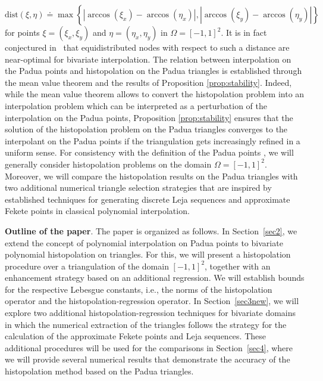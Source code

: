 \documentclass{svjour3}
\begin{document}
$$ \mathrm{dist} (\xi, \eta) \doteq \max \left\{ \left|\arccos\left(\xi_x\right) - \arccos\left(\eta_x\right) \right|, \left| \arccos\left(\xi_y\right) - \arccos\left(\eta_y\right) \right| \right\} $$
for points $ \xi = \left(\xi_x, \xi_y\right) $ and $ \eta = \left(\eta_x,\eta_y\right) $ in $ \Omega = [-1,1]^2 $. It is in fact conjectured in~\cite{CDMV} that equidistributed nodes with respect to such a distance are near-optimal for bivariate interpolation. The  relation between interpolation on the Padua points and histopolation on the Padua triangles is established through the mean value theorem and the results of Proposition \ref{prop:stability}. Indeed, while the mean value theorem allows to convert the histopolation problem into an interpolation problem which can be interpreted as a perturbation of the interpolation on the Padua points, Proposition \ref{prop:stability} ensures that the solution of the histopolation problem on the Padua triangles converges to the interpolant on the Padua points if the triangulation gets increasingly refined in a uniform sense. For consistency with the definition of the Padua points \cite{PaduaComputational}, we will generally consider histopolation problems on the domain $ \Omega = [-1,1]^2 $. Moreover, we will compare the histopolation results on the Padua triangles with two additional numerical triangle selection strategies that are inspired by established techniques for generating discrete Leja sequences and approximate Fekete points in classical polynomial interpolation. 


\noindent \textbf{Outline of the paper}. The paper is organized as follows. In Section~\ref{sec2}, we extend the concept of polynomial interpolation on Padua points to bivariate polynomial histopolation on triangles. For this, we will present a histopolation procedure over a triangulation of the domain $[-1,1]^2$, together with an enhancement strategy based on an additional regression. We will establish bounds for the respective Lebesgue constants, i.e., the norms of the histopolation operator and the histopolation-regression operator. In Section~\ref{sec3new}, we will explore two additional histopolation-regression techniques for bivariate domains in which the numerical extraction of the triangles follows the strategy for the calculation of the approximate Fekete points and Leja sequences. These additional procedures will be used for the comparisons in Section~\ref{sec4}, where we will provide several numerical results that demonstrate the accuracy of the histopolation method based on the Padua triangles.
\end{document}
